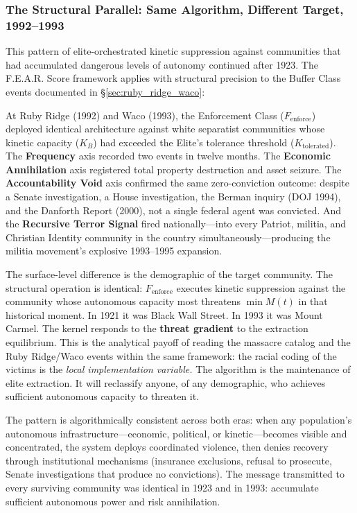 \subsubsection{The Structural Parallel: Same Algorithm, Different Target, 1992--1993}
\label{sec:fear_waco_parallel}

This pattern of elite-orchestrated kinetic suppression against communities that had accumulated dangerous levels of autonomy continued after 1923. The F.E.A.R. Score framework applies with structural precision to the Buffer Class events documented in §\ref{sec:ruby_ridge_waco}:

At Ruby Ridge (1992) and Waco (1993), the Enforcement Class ($F_{\text{enforce}}$) deployed identical architecture against white separatist communities whose kinetic capacity ($K_B$) had exceeded the Elite's tolerance threshold ($K_{\text{tolerated}}$). The \textbf{Frequency} axis recorded two events in twelve months. The \textbf{Economic Annihilation} axis registered total property destruction and asset seizure. The \textbf{Accountability Void} axis confirmed the same zero-conviction outcome: despite a Senate investigation, a House investigation, the Berman inquiry (DOJ 1994), and the Danforth Report (2000), not a single federal agent was convicted. And the \textbf{Recursive Terror Signal} fired nationally---into every Patriot, militia, and Christian Identity community in the country simultaneously---producing the militia movement's explosive 1993--1995 expansion.

The surface-level difference is the demographic of the target community. The structural operation is identical: $F_{\text{enforce}}$ executes kinetic suppression against the community whose autonomous capacity most threatens $\min M(t)$ in that historical moment. In 1921 it was Black Wall Street. In 1993 it was Mount Carmel. The kernel responds to the \textbf{threat gradient} to the extraction equilibrium. This is the analytical payoff of reading the massacre catalog and the Ruby Ridge/Waco events within the same framework: the racial coding of the victims is the \textit{local implementation variable.} The algorithm is the maintenance of elite extraction. It will reclassify anyone, of any demographic, who achieves sufficient autonomous capacity to threaten it.

The pattern is algorithmically consistent across both eras: when any population's autonomous infrastructure---economic, political, or kinetic---becomes visible and concentrated, the system deploys coordinated violence, then denies recovery through institutional mechanisms (insurance exclusions, refusal to prosecute, Senate investigations that produce no convictions). The message transmitted to every surviving community was identical in 1923 and in 1993: accumulate sufficient autonomous power and risk annihilation.

